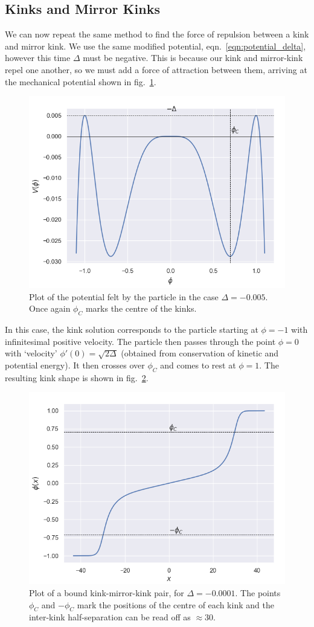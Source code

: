 \documentclass[11pt, oneside]{article}  	%
\numberwithin{equation}{section}
\begin{document}
\subsection{Kinks and Mirror Kinks}\label{sec:kinks_mirror_kinks_gonzales}
We can now repeat the same method to find the force of repulsion between a kink and mirror kink. We use the same modified potential, eqn.~\ref{eqn:potential_delta}, however this time $\Delta$ must be negative. This is because our kink and mirror-kink repel one another, so we must add a force of attraction between them, arriving at the mechanical potential shown in fig.~\ref{mechanical_2}.\par
\begin{figure}
   \centering
   \includegraphics[width=0.4\columnwidth]{mechanical_potential_mirrorkink}
   \caption{Plot of the potential felt by the particle in the case $\Delta = -0.005$. Once again $\phi_C$ marks the centre of the kinks.} 
   \label{mechanical_2}
\end{figure}
In this case, the kink solution corresponds to the particle starting at $\phi = -1$ with infinitesimal positive velocity. The particle then passes through the point $\phi = 0$ with `velocity' $\phi'(0)=\sqrt{2\Delta}$ (obtained from conservation of kinetic and potential energy). It then crosses over $\phi_C$ and comes to rest at $\phi=1$. The resulting kink shape is shown in fig.~\ref{kink_mirrorkink_pair}.\par
\begin{figure}
   \centering
   \includegraphics[width=0.4\columnwidth]{kink_mirrorkink_pair}
   \caption{Plot of a bound kink-mirror-kink pair, for $\Delta = -0.0001$. The points $\phi_C$ and $-\phi_C$ mark the positions of the centre of each kink and the inter-kink half-separation can be read off as  $\approx 30$.} 
   \label{kink_mirrorkink_pair}
\end{figure}
\end{document}
